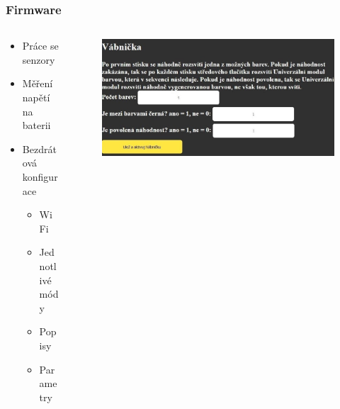 \documentclass[%
  12pt,       				%
	t,                  %
	aspectratio=1610,   %
	unicode,						%
]{beamer}				    	%
\begin{document}
\begin{frame}
	\frametitle{Firmware}
	\begin{columns}[T] 	
		\begin{column}{0.35\textwidth}	
			\begin{itemize}	
				\item Práce se senzory 
				\item Měření napětí na baterii
				\item Bezdrátová konfigurace
				\begin{itemize}
					\item WiFi
					\item Jednotlivé módy 
					\item Popisy
					\item Parametry 
				\end{itemize}
			\end{itemize}
		\end{column}

		\begin{column}{0.65\textwidth}	
			\begin{figure}
				\centering	          
				\includegraphics[width=1\columnwidth]{obrazky/konfiguracni_webova_stranka_prezentace.jpg}
			\end{figure}
		\end{column}
	\end{columns}
\end{frame}
\end{document}
